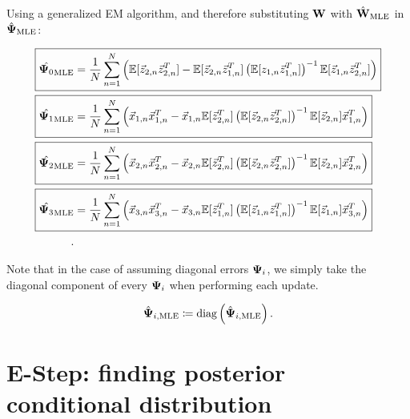 \begin{landscape}
Using a generalized EM algorithm, and therefore substituting $\bold{W}$ with
$\hat{\bold{W}}_{\text{MLE}}$ in $\hat{\bold{\Psi}}_{\text{MLE}}$:

\begin{align*}
\Aboxed{ \hat{\bpsi_0}_{\text{MLE}} &=  \frac{1}{N}  \sum_{n=1}^N \left( \ev[\z_{2,n} \z_{2,n}^T] -  \ev [\z_{2,n} \z_{1,n}^T]
                             \left( \ev [z_{1,n} \z_{1,n}^T ] \right)^{-1} \ev[
                                      \z_{1,n} \z_{2,n}^T] \right) }\\
\Aboxed{   \hat{\bpsi_1}_{\text{MLE}} &=\frac{1}{N}  \sum_{n=1}^N  \left( \x_{1,n} \x_{1,n}^T - \x_{1,n} \ev[\z_{2,n}^T]
                                        \left( \ev [\z_{2,n} \z_{2,n}^T
                                        ]\right)^{-1} \ev[\z_{2,n}]
                               \x_{1,n}^T \right)}\\
  \Aboxed{   \hat{\bpsi_2}_{\text{MLE}} &= \frac{1}{N}  \sum_{n=1}^N  \left( \x_{2,n} \x_{2,n}^T - \x_{2,n} \ev[\z_{2,n}^T]
                                        \left( \ev [\z_{2,n} \z_{2,n}^T
                                        ]\right)^{-1} \ev[\z_{2,n}]
                                 \x_{2,n}^T \right)}\\
    \Aboxed{   \hat{\bpsi_3}_{\text{MLE}} &= \frac{1}{N}  \sum_{n=1}^N
                                            \left( \x_{3,n} \x_{3,n}^T - \x_{3,n} \ev[\z_{1,n}^T]
                                        \left( \ev [\z_{1,n} \z_{1,n}^T
                                        ]\right)^{-1} \ev[\z_{1,n}] \x_{3,n}^T
                                            \right)}\\
.\end{align*}

Note that in the case of assuming diagonal errors $\bold{\Psi}_i$, we simply
take the diagonal component of every $\bold{\Psi}_i$ when performing each
update. 

\begin{align}
  \hat{\bold{\Psi}}_{i, \text{MLE}} \coloneqq \text{diag}
  \left(\hat{\bold{\Psi}}_{i, \text{MLE}} \right)
.\end{align}
\pagebreak
\section{E-Step: finding posterior conditional distribution}



\end{landscape}
